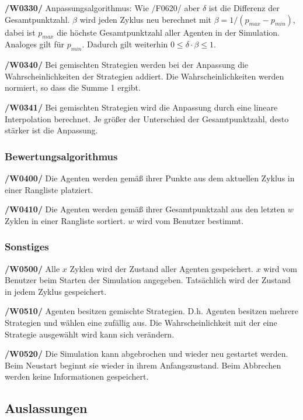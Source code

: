 \textbf{/W0330/}
Anpassungsalgorithmus: Wie /F0620/ aber $\delta$ ist die Differenz der Gesamtpunktzahl. $\beta$ wird jeden Zyklus neu berechnet mit $\beta = 1/(p_{max}-p_{min})$, dabei ist $p_{max}$ die höchste Gesamtpunktzahl aller Agenten in der Simulation. Analoges gilt für $p_{min}$. Dadurch gilt weiterhin $0 \leq \delta \cdot \beta \leq 1$.

\textbf{/W0340/}
Bei gemischten Strategien werden bei der Anpassung die Wahrscheinlichkeiten der Strategien addiert. Die Wahrscheinlichkeiten werden normiert, so dass die Summe 1 ergibt.

\textbf{/W0341/}
Bei gemischten Strategien wird die Anpassung durch eine lineare Interpolation berechnet. Je größer der Unterschied der Gesamtpunktzahl, desto stärker ist die Anpassung.


\subsubsection{Bewertungsalgorithmus}

\textbf{/W0400/}
Die Agenten werden gemäß ihrer Punkte aus dem aktuellen Zyklus in einer Rangliste platziert.

\textbf{/W0410/}
Die Agenten werden gemäß ihrer Gesamtpunktzahl aus den letzten $w$ Zyklen in einer Rangliste sortiert. $w$ wird vom Benutzer bestimmt.

\subsubsection{Sonstiges}

\textbf{/W0500/}
Alle $x$ Zyklen wird der Zustand aller Agenten gespeichert. $x$ wird vom Benutzer beim Starten der Simulation angegeben. {\color{red} Tatsächlich wird der Zustand in jedem Zyklus gespeichert.}

\textbf{/W0510/}
Agenten besitzen gemischte Strategien. D.h. Agenten besitzen mehrere Strategien und wählen eine zufällig aus. Die Wahrscheinlichkeit mit der eine Strategie ausgewählt wird kann sich verändern.

\textbf{/W0520/}
Die Simulation kann abgebrochen und wieder neu gestartet werden. Beim Neustart beginnt sie wieder in ihrem Anfangszustand. Beim Abbrechen werden keine Informationen gespeichert.

\subsection{Auslassungen}

